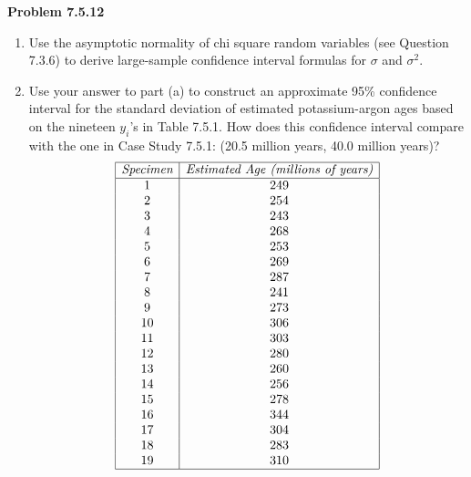\documentclass{article}
\begin{document}
\textbf{Problem 7.5.12}
\begin{enumerate}[label=(\alph*)]
    \item 
    Use the asymptotic normality of chi square random variables (see Question 7.3.6) to derive large-sample confidence interval formulas for $\sigma$ and $\sigma^2$.

    \item
    Use your answer to part (a) to construct an approximate 95\% confidence interval for the standard deviation of estimated potassium-argon ages based on the nineteen $y_i$'s in Table 7.5.1. 
    How does this confidence interval compare with the one in Case Study 7.5.1: (20.5 million years, 40.0 million years)?
    \begin{displaymath}
        \begin{array}{|c|c|}
            \hline
            \emph{Specimen} & \emph{Estimated Age (millions of years)} \\
            \hline
            1 & 249 \\
            2 & 254 \\
            3 & 243 \\
            4 & 268 \\
            5 & 253 \\
            6 & 269 \\
            7 & 287 \\
            8 & 241 \\ 
            9 & 273 \\
            10 & 306 \\
            11 & 303 \\
            12 & 280 \\
            13 & 260 \\
            14 & 256 \\
            15 & 278 \\
            16 & 344 \\
            17 & 304 \\
            18 & 283 \\
            19 & 310 \\            
            \hline
        \end{array}
    \end{displaymath}
\end{enumerate}
\end{document}
